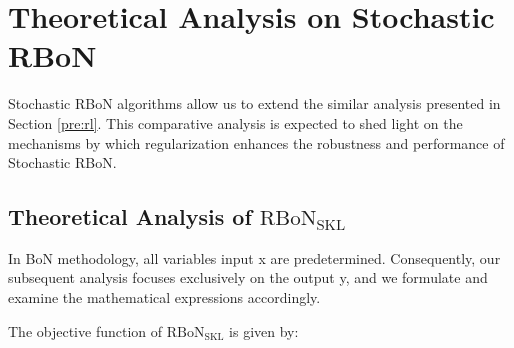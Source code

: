 \section{Theoretical Analysis on Stochastic RBoN}

Stochastic RBoN algorithms allow us to extend the similar analysis presented in Section \ref{pre:rl}. This comparative analysis is expected to shed light on the mechanisms by which regularization enhances the robustness and performance of Stochastic RBoN.






\subsection{Theoretical Analysis of $\mathrm{RBoN}_{\mathrm{SKL}}$}\label{sec:kl_sec}
In BoN methodology, all variables input x are predetermined. Consequently, our subsequent analysis focuses exclusively on the output y, and we formulate and examine the mathematical expressions accordingly.

The objective function of $\mathrm{RBoN}_{\mathrm{SKL}}$ is given by:




